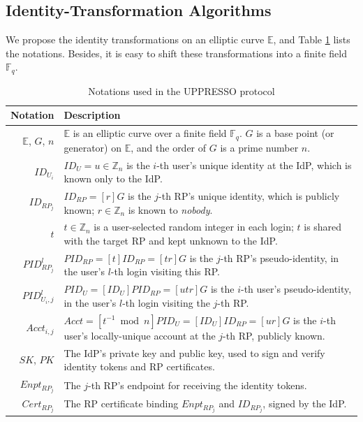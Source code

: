 \subsection{Identity-Transformation Algorithms}
\label{subsec:overview}

We propose the identity transformations on an elliptic curve $\mathbb{E}$,
and Table \ref{tbl:notations-protocol} lists the notations.
Besides, it is easy to shift these transformations into a finite field $\mathbb{F}_q$.


\begin{table}[tb]
\footnotesize
    \caption{Notations used in the UPPRESSO protocol}
    \centering
    \begin{tabular}{|r|p{6.79cm}|} \hline
    {\textbf{Notation}} & {\textbf{Description}} \\ \hline
    {$\mathbb{E}$, $G$, $n$} & {$\mathbb{E}$ is an elliptic curve over a finite field $\mathbb{F}_q$. $G$ is a base point (or generator) on $\mathbb{E}$, and the order of $G$ is a prime number $n$.} \\ \hline
    {$ID_{U_i}$} & {$ID_U = u \in \mathbb{Z}_n$ is the $i$-th user's unique identity at the IdP, which is known only to the IdP.} \\ \hline
   {$ID_{RP_j}$} & {$ID_{RP} = [r]G$ is the $j$-th RP's unique identity, which is publicly known; $r \in \mathbb{Z}_n$ is known to \emph{nobody}.} \\ \hline
    {$t$} & {$t \in \mathbb{Z}_n$ is a user-selected random integer in each login; $t$ is shared with the target RP and kept unknown to the IdP.} \\ \hline
    {$PID_{RP_j}^l$} & {$PID_{RP} = [t]{ID_{RP}} = [tr]G$ is the $j$-th RP's pseudo-identity, in the user's $l$-th login visiting this RP.} \\ \hline
    {$PID_{U_i,j}^l$} & {$PID_U = [{ID_U}]{PID_{RP}} = [utr]G$ is the $i$-th user's pseudo-identity, in the user's $l$-th login visiting the $j$-th RP.} \\ \hline
     {$Acct_{i,j}$} & {$Acct = [t^{-1}\bmod n]PID_{U} = [ID_U]ID_{RP} = [ur]G$ is the $i$-th user's locally-unique account at the $j$-th RP, publicly known.} \\ \hline
    {$SK$, $PK$} & {The IdP's private key and public key, used to sign and verify identity tokens and RP certificates.} \\ \hline
    {$Enpt_{RP_j}$} & {The $j$-th RP's endpoint for receiving the identity tokens.} \\ \hline
    {$Cert_{RP_j}$} & {The RP certificate binding $Enpt_{RP_j}$ and $ID_{RP_j}$, signed by the IdP.} \\ \hline
    \end{tabular}
    \label{tbl:notations-protocol}
\end{table}

